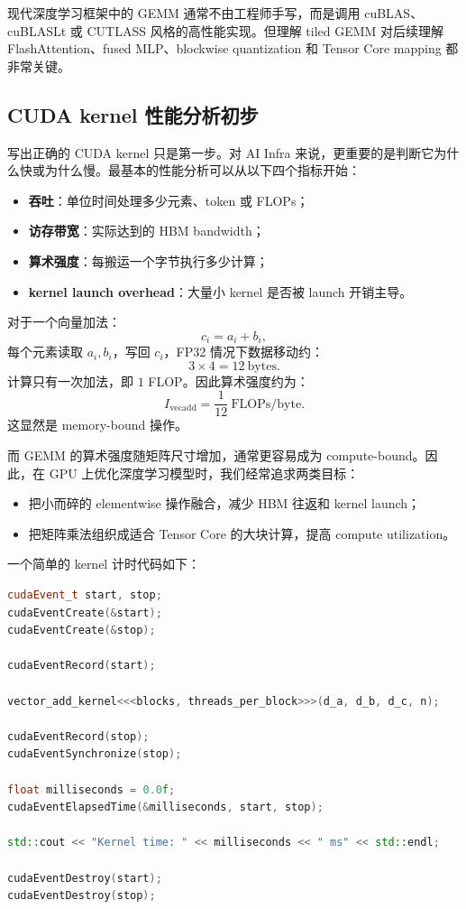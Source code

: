 现代深度学习框架中的 GEMM 通常不由工程师手写，而是调用 cuBLAS、cuBLASLt 或 CUTLASS 风格的高性能实现。但理解 tiled GEMM 对后续理解 FlashAttention、fused MLP、blockwise quantization 和 Tensor Core mapping 都非常关键。

\subsection{CUDA kernel 性能分析初步}
\label{subsec:cuda-kernel-performance-basics}

写出正确的 CUDA kernel 只是第一步。对 AI Infra 来说，更重要的是判断它为什么快或为什么慢。最基本的性能分析可以从以下四个指标开始：

\begin{itemize}
  \item \textbf{吞吐}：单位时间处理多少元素、token 或 FLOPs；
  \item \textbf{访存带宽}：实际达到的 HBM bandwidth；
  \item \textbf{算术强度}：每搬运一个字节执行多少计算；
  \item \textbf{kernel launch overhead}：大量小 kernel 是否被 launch 开销主导。
\end{itemize}

对于一个向量加法：
\[
  c_i=a_i+b_i,
\]
每个元素读取 $a_i,b_i$，写回 $c_i$，FP32 情况下数据移动约：
\[
  3\times 4=12\ \mathrm{bytes}.
\]
计算只有一次加法，即 $1$ FLOP。因此算术强度约为：
\[
  I_{\mathrm{vecadd}}=\frac{1}{12}\ \mathrm{FLOPs/byte}.
\]
这显然是 memory-bound 操作。

而 GEMM 的算术强度随矩阵尺寸增加，通常更容易成为 compute-bound。因此，在 GPU 上优化深度学习模型时，我们经常追求两类目标：

\begin{itemize}
  \item 把小而碎的 elementwise 操作融合，减少 HBM 往返和 kernel launch；
  \item 把矩阵乘法组织成适合 Tensor Core 的大块计算，提高 compute utilization。
\end{itemize}

一个简单的 kernel 计时代码如下：

\begin{lstlisting}[language=C++,caption={使用 CUDA Event 统计 kernel 执行时间},label={lst:cuda-event-timing}]
cudaEvent_t start, stop;
cudaEventCreate(&start);
cudaEventCreate(&stop);

cudaEventRecord(start);

vector_add_kernel<<<blocks, threads_per_block>>>(d_a, d_b, d_c, n);

cudaEventRecord(stop);
cudaEventSynchronize(stop);

float milliseconds = 0.0f;
cudaEventElapsedTime(&milliseconds, start, stop);

std::cout << "Kernel time: " << milliseconds << " ms" << std::endl;

cudaEventDestroy(start);
cudaEventDestroy(stop);
\end{lstlisting}

